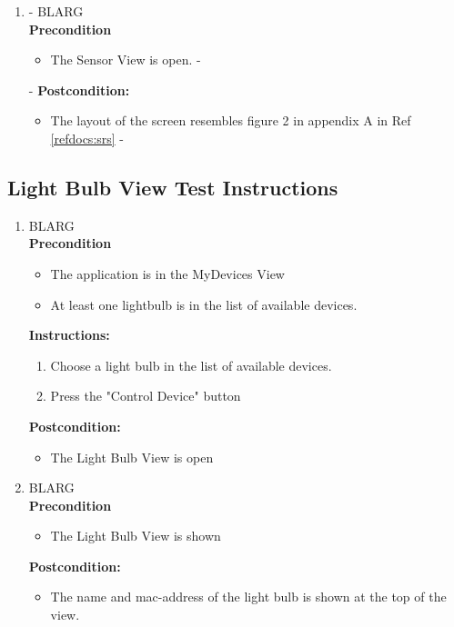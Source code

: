 \documentclass[a4paper]{article}
\newlength{\testlabellength}
\newenvironment{testlist}{\begin{enumerate}[label=\bfseries Instruction \thesubsection.\arabic* , labelindent=0pt, labelwidth=\testlabellength , leftmargin=2cm]}{\end{enumerate}}
\newenvironment{precondition}{
{\color{white}BLARG}\\ 
\textbf{Precondition}
\begin{itemize}[labelindent=0cm, labelwidth=2cm , leftmargin=1cm]
}
{\end{itemize}}
\newenvironment{instruction}{
\textbf{Instructions:}
\begin{enumerate}[label=\bfseries  \arabic*., labelindent=0cm, labelwidth=2cm , leftmargin=1cm]
}
{\end{enumerate}}
\newenvironment{postcondition}{
\textbf{Postcondition:}
\begin{itemize}[labelindent=0cm, labelwidth=2cm , leftmargin=1cm]
}
{\end{itemize}}
\begin{document}
\begin{appendices}
\begin{testlist}
-
-%
-
-	\item
-		\begin{precondition}
-			\item The Sensor View is open.
-		\end{precondition}
-		\begin{postcondition}
-			\item The layout of the screen resembles figure 2 in appendix A in Ref \ref{refdocs:srs}
-		\end{postcondition}
\end{testlist}

\subsection{Light Bulb View Test Instructions}
\begin{testlist}

    \item
    	\begin{precondition}
    		\item The application is in the MyDevices View
    		\item At least one lightbulb is in the list of available devices.
    	\end{precondition}
    	\begin{instruction}
    			\item Choose a light bulb in the list of available devices.
    			\item Press the "Control Device" button
    	\end{instruction}
    	\begin{postcondition}
    		\item The Light Bulb View is open
    	\end{postcondition}

	
	\item
		\begin{precondition}
			\item The Light Bulb View is shown
		\end{precondition}
    	\begin{postcondition}
    		\item The name and mac-address of the light bulb is shown at the top of the view.
    	\end{postcondition}
    	

\end{testlist}
\end{appendices}
\end{document}
